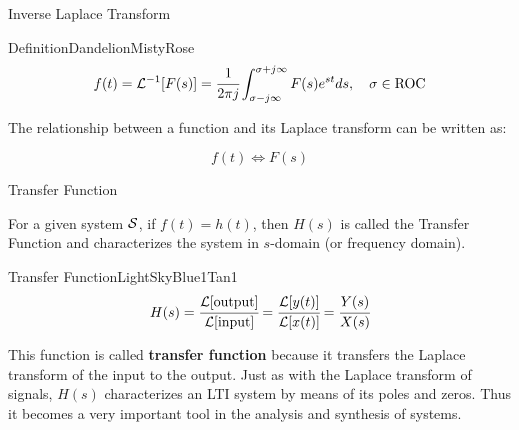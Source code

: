 \documentclass[aspectratio=169,xcolor=dvipsnames,svgnames,x11names,fleqn]{beamer}
\begin{document}
\begin{frame}{Inverse Laplace Transform}
    \begin{custombox}{Definition}{Dandelion}{MistyRose}
    \Large
        \begin{equation}
            f(t) = {\mathcal L}^{-1}[F(s)] = \cfrac{1}{2\pi j}\int_{\sigma - j\infty}^{\sigma + j\infty} F(s)e^{st}ds, \quad \sigma \in \textrm{ROC}
        \end{equation}
    \end{custombox}
    The relationship between a function and its Laplace transform can be written as:
    \begin{center}
        \begin{equation}
            f(t) \iff F(s)
        \end{equation}
    \end{center}
    
\end{frame}

\begin{frame}{Transfer Function}
\begin{center}
    For a given system ${\mathcal S}$, if $f(t) = h(t)$, then $H(s)$ is called the Transfer Function and characterizes the system in $s$-domain (or frequency domain).
    
    \vspace{20pt}
    


\footnotesize

\begin{custombox}{Transfer Function}{LightSkyBlue1}{Tan1}
    $$
    H(s) = \cfrac{{\mathcal L}[\text{output}]}{{\mathcal L}[\text{input}]} = \cfrac{{\mathcal L}[y(t)]}{{\mathcal L}[x(t)]} = \cfrac{Y(s)}{X(s)}
    $$
    
\end{custombox}
    This function is called \textbf{transfer function} because it transfers the Laplace transform of the input to the output. Just as with the Laplace transform of signals, $H (s)$ characterizes an LTI system by means of its poles and zeros. Thus it becomes a very important tool in the analysis and synthesis of systems.

\end{center}

\end{frame}
\end{document}
